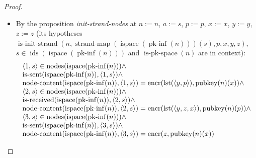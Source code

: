 \documentclass[11pt]{article}
\theoremstyle{plain}
\begin{document}
\begin{proof}
\begin{itemize}[leftmargin=2.8em, itemsep=4pt, parsep=1pt]
  \item[\textbf{66}] By the proposition \emph{init-strand-nodes} at $n := n$, $a := s$, $p := p$, $x := x$, $y := y$, $z := z$ (its hypotheses $\operatorname{is\text{-}init\text{-}strand}(n, \operatorname{strand\text{-}map}(\operatorname{ispace}(\operatorname{pk\text{-}inf}(n)))(s), p, x, y, z)$, $s \in \operatorname{ids}(\operatorname{ispace}(\operatorname{pk\text{-}inf}(n)))$ and $\operatorname{is\text{-}pk\text{-}space}(n)$ are in context):
\begin{equation*}
\begin{array}{@{}l@{}} \langle 1, s \rangle \in \operatorname{nodes}(\operatorname{ispace}(\operatorname{pk\text{-}inf}(n))) \wedge \\ \operatorname{is\text{-}sent}(\operatorname{ispace}(\operatorname{pk\text{-}inf}(n)), \langle 1, s \rangle) \wedge \\ \operatorname{node\text{-}content}(\operatorname{ispace}(\operatorname{pk\text{-}inf}(n)), \langle 1, s \rangle) = \operatorname{encr}(\operatorname{lst}(\langle y, p \rangle), \operatorname{pubkey}(n)(x)) \wedge \\ \langle 2, s \rangle \in \operatorname{nodes}(\operatorname{ispace}(\operatorname{pk\text{-}inf}(n))) \wedge \\ \operatorname{is\text{-}received}(\operatorname{ispace}(\operatorname{pk\text{-}inf}(n)), \langle 2, s \rangle) \wedge \\ \operatorname{node\text{-}content}(\operatorname{ispace}(\operatorname{pk\text{-}inf}(n)), \langle 2, s \rangle) = \operatorname{encr}(\operatorname{lst}(\langle y, z, x \rangle), \operatorname{pubkey}(n)(p)) \wedge \\ \langle 3, s \rangle \in \operatorname{nodes}(\operatorname{ispace}(\operatorname{pk\text{-}inf}(n))) \wedge \\ \operatorname{is\text{-}sent}(\operatorname{ispace}(\operatorname{pk\text{-}inf}(n)), \langle 3, s \rangle) \wedge \\ \operatorname{node\text{-}content}(\operatorname{ispace}(\operatorname{pk\text{-}inf}(n)), \langle 3, s \rangle) = \operatorname{encr}(z, \operatorname{pubkey}(n)(x)) \end{array}
\end{equation*}


\end{itemize}
\end{proof}
\end{document}
